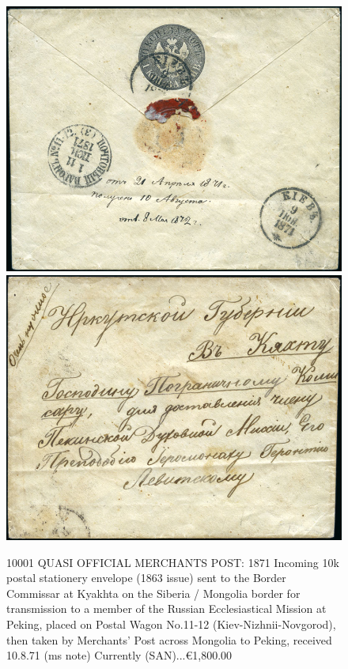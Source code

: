 \begin{figure}[htbp]
\includegraphics[width=.98\textwidth]{../russian-post-offices-in-china/10001.jpg}
\includegraphics[width=.98\textwidth]{../russian-post-offices-in-china/10001-1.jpg}
\caption{
10001 QUASI OFFICIAL MERCHANTS POST: 1871 Incoming 10k postal 
stationery envelope (1863 issue) sent to the Border Commissar at Kyakhta 
on the Siberia / Mongolia border for transmission to a member of the 
Russian Ecclesiastical Mission at Peking, placed on Postal Wagon No.11-12 
(Kiev-Nizhnii-Novgorod), then taken by Merchants' Post across Mongolia to 
Peking, received 10.8.71 (ms note)
Currently (SAN)...\euro 1,800.00
}        
\end{figure}







